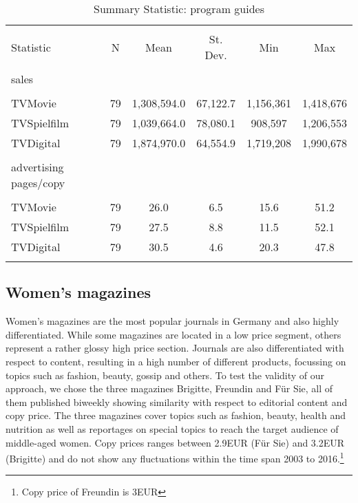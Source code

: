 \documentclass[12pt,a4paper]{scrreprt}
\begin{document}
\begin{table}[!htbp] \centering 
  \caption{Summary Statistic: program guides} 
  \label{tab_tv1} 
\begin{tabular}{@{\extracolsep{5pt}}lccccc} 
\\[-1.8ex]\hline 
\hline \\[-1.8ex] 
Statistic & \multicolumn{1}{c}{N} & \multicolumn{1}{c}{Mean} & \multicolumn{1}{c}{St. Dev.} & \multicolumn{1}{c}{Min} & \multicolumn{1}{c}{Max} \\ 
\hline \\[-1.8ex] 
sales \\
\hline \\[-1.8ex]
TVMovie & 79 & 1,308,594.0 & 67,122.7 & 1,156,361 & 1,418,676 \\ 
TVSpielfilm & 79 & 1,039,664.0 & 78,080.1 & 908,597 & 1,206,553 \\ 
TVDigital & 79 & 1,874,970.0 & 64,554.9 & 1,719,208 & 1,990,678 \\ 
\hline \\[-1.8ex] 
advertising pages/copy \\
\hline \\[-1.8ex]
TVMovie & 79 & 26.0 & 6.5 & 15.6 & 51.2 \\ 
TVSpielfilm & 79 & 27.5 & 8.8 & 11.5 & 52.1 \\ 
TVDigital & 79 & 30.5 & 4.6 & 20.3 & 47.8 \\ 
\hline \\[-1.8ex] 
\end{tabular} 
\end{table}



\subsection{Women's magazines}


Women's magazines are the most popular journals in Germany and also highly differentiated. While some magazines are located in a low price segment, others represent a rather glossy high price section. Journals are also differentiated with respect to content, resulting in a high number of different products, focussing on topics such as fashion, beauty, gossip and others. To test the validity of our approach, we chose the three magazines Brigitte, Freundin and Für Sie, all of them published biweekly showing similarity with respect to editorial content and copy price. The three magazines cover topics such as fashion, beauty, health and nutrition as well as reportages on special topics to reach the target audience of middle-aged women. Copy prices ranges between 2.9EUR (Für Sie) and 3.2EUR (Brigitte) and do not show any fluctuations within the time span 2003 to 2016.\footnote{Copy price of Freundin is 3EUR} 
\end{document}
